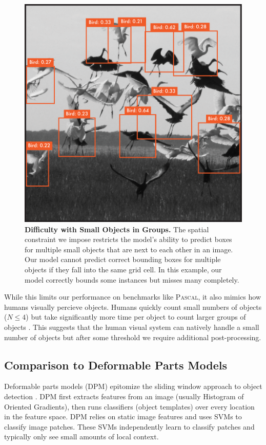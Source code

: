 \documentclass{article} %
\begin{document}
\begin{figure}[h]
\begin{center}
        \includegraphics[width=.9\linewidth]{birds}
\end{center}
   \caption{\textbf{Difficulty with Small Objects in Groups.} The spatial constraint we impose restricts the model's ability to predict boxes for multiple small objects that are next to each other in an image. Our model cannot predict correct bounding boxes for multiple objects if they fall into the same grid cell. In this example, our model correctly bounds some instances but misses many completely.}
\label{birds}
\end{figure}

While this limits our performance on benchmarks like \textsc{Pascal}, it also mimics how humans visually percieve objects. Humans quickly count small numbers of objects ($N \le 4$) but take significantly more time per object to count larger groups of objects \cite{piazza2002subitizing}. This suggests that the human visual system can natively handle a small number of objects but after some threshold we require additional post-processing.

\subsection{Comparison to Deformable Parts Models}

Deformable parts models (DPM) epitomize the sliding window approach to object detection \cite{lsvm-pami}. DPM first extracts features from an image (usually Histogram of Oriented Gradients), then runs classifiers (object templates) over every location in the feature space. DPM relies on static image features and uses SVMs to classify image patches. These SVMs independently learn to classify patches and typically only see small amounts of local context.
\end{document}
